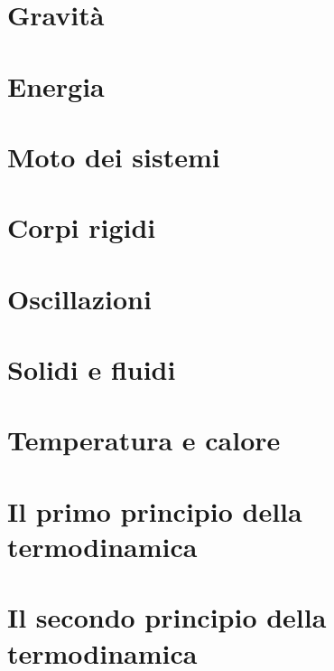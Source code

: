 \documentclass[a4paper]{extarticle}
\begin{document}
\newpage
\section{Gravità}

\newpage
\section{Energia}

\newpage
\section{Moto dei sistemi}

\newpage
\section{Corpi rigidi}

\newpage
\section{Oscillazioni}

\newpage
\section{Solidi e fluidi}

\newpage
\section{Temperatura e calore}

\newpage
\section{Il primo principio della termodinamica}

\newpage
\section{Il secondo principio della termodinamica}
\end{document}
